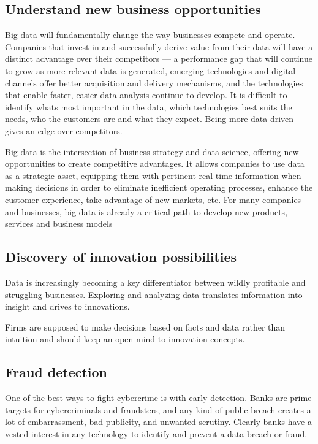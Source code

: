 \documentclass[sigconf]{acmart}
\begin{document}
\subsection{Understand new business opportunities}
Big data will fundamentally change the way businesses
compete and operate. Companies that invest in and
successfully derive value from their data will have a distinct advantage over their competitors — a performance gap that will continue to grow as more relevant data is generated, emerging technologies and digital channels offer better acquisition and delivery mechanisms, and the technologies that enable faster, easier data analysis continue to develop. It is difficult to identify whats most important in the data, which technologies best suits the needs, who the customers are and what they expect. Being more data-driven gives an edge over competitors.\cite{bigdata-ey}

Big data is the intersection of business strategy and data science, offering new opportunities to create competitive advantages. It allows companies to use data as a strategic asset, equipping them with pertinent real-time information when making decisions in order to eliminate inefficient operating processes, enhance the customer experience, take advantage of new markets, etc.
For many companies and businesses, big data is already a critical path to develop new products, services and business models\cite{Accenture-Next-Generation-Financial}

\subsection{Discovery of innovation possibilities}
Data is increasingly becoming a key differentiator between wildly profitable and struggling businesses. Exploring and analyzing data translates information into insight and drives to innovations. \cite{bigdata-innovations}

Firms are supposed to make decisions based on facts and data rather than intuition and should keep an open mind to innovation concepts. 

\subsection{Fraud detection}
One of the best ways to fight cybercrime is with early detection. Banks are prime targets for cybercriminals and fraudsters, and any kind of public breach creates a lot of embarrassment, bad publicity, and unwanted scrutiny. Clearly banks have a vested interest in any technology to identify and prevent a data breach or fraud.\cite{the-top-5-trends-for-big-data-in-financial-services}
\end{document}

